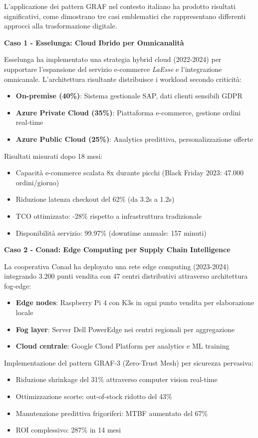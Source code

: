 L'applicazione dei pattern GRAF nel contesto italiano ha prodotto risultati significativi, come dimostrano tre casi emblematici che rappresentano differenti approcci alla trasformazione digitale.

\textbf{Caso 1 - Esselunga: Cloud Ibrido per Omnicanalità}

Esselunga ha implementato una strategia hybrid cloud (2022-2024) per supportare l'espansione del servizio e-commerce \textit{LaEsse} e l'integrazione omnicanale. L'architettura risultante distribuisce i workload secondo criticità:
\begin{itemize}
\item \textbf{On-premise (40\%)}: Sistema gestionale SAP, dati clienti sensibili GDPR
\item \textbf{Azure Private Cloud (35\%)}: Piattaforma e-commerce, gestione ordini real-time
\item \textbf{Azure Public Cloud (25\%)}: Analytics predittiva, personalizzazione offerte
\end{itemize}

Risultati misurati dopo 18 mesi:
\begin{itemize}
\item Capacità e-commerce scalata 8x durante picchi (Black Friday 2023: 47.000 ordini/giorno)
\item Riduzione latenza checkout del 62\% (da 3.2s a 1.2s)
\item TCO ottimizzato: -28\% rispetto a infrastruttura tradizionale
\item Disponibilità servizio: 99.97\% (downtime annuale: 157 minuti)
\end{itemize}

\textbf{Caso 2 - Conad: Edge Computing per Supply Chain Intelligence}

La cooperativa Conad ha deployato una rete edge computing (2023-2024) integrando 3.200 punti vendita con 47 centri distributivi attraverso architettura fog-edge:
\begin{itemize}
\item \textbf{Edge nodes}: Raspberry Pi 4 con K3s in ogni punto vendita per elaborazione locale
\item \textbf{Fog layer}: Server Dell PowerEdge nei centri regionali per aggregazione
\item \textbf{Cloud centrale}: Google Cloud Platform per analytics e ML training
\end{itemize}

Implementazione del pattern GRAF-3 (Zero-Trust Mesh) per sicurezza pervasiva:
\begin{itemize}
\item Riduzione shrinkage del 31\% attraverso computer vision real-time
\item Ottimizzazione scorte: out-of-stock ridotto del 43\%
\item Manutenzione predittiva frigoriferi: MTBF aumentato del 67\%
\item ROI complessivo: 287\% in 14 mesi
\end{itemize}

